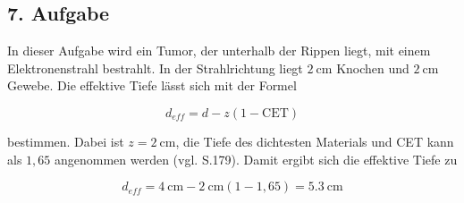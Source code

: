 \subsection*{7. Aufgabe}

In dieser Aufgabe wird ein Tumor, der unterhalb der Rippen liegt, mit einem
Elektronenstrahl bestrahlt. In der Strahlrichtung liegt $\SI{2}{\centi\meter}$
Knochen und $\SI{2}{\centi\meter}$ Gewebe. Die effektive Tiefe lässt sich
mit der Formel

\begin{equation*}
  d_{eff} = d - z(1-\text{CET})
\end{equation*}

bestimmen. Dabei ist $z = \SI{2}{\centi\meter}$, die Tiefe des dichtesten
Materials und CET kann als $1,65$ angenommen werden (vgl. S.179). Damit
ergibt sich die effektive Tiefe zu

\begin{equation*}
  d_{eff} = \SI{4}{\centi\meter} - \SI{2}{\centi\meter} (1 - 1,65) = \SI{5.3}{\centi\meter}
\end{equation*}
